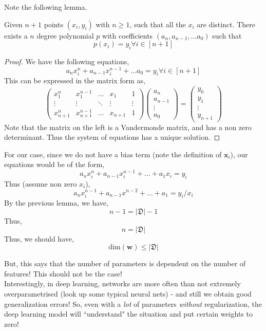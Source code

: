 Note the following lemma.
\begin{lemma}
Given $n+1$ points $(x_i,y_i)$ with $n \geq 1$, such that all the $x_i$ are distinct. There exists a $n$ degree polynomial $p$ with coefficients $(a_n,a_{n-1}, \dots a_0)$ such that
\[p(x_i) = y_i \forall i \in [n+1]\]
\end{lemma}
\begin{proof}
We have the following equations,
\[a_nx_i^n + a_{n-1}x_i^{n-1} + \dots a_0 = y_i \forall i \in [n+1]\]
This can be expressed in the matrix form as,
\[\begin{pmatrix} x_1^n & x_1^{n-1} & \dots &x_1& 1 \\ 
\vdots & \vdots & \ddots &\vdots&\vdots \\  x_{n+1}^n & x_{n+1}^{n-1} & \dots &x_{n+1}& 1
\end{pmatrix} \begin{pmatrix} a_n \\ a_{n-1} \\ \vdots \\ a_0 \end{pmatrix} = \begin{pmatrix}y_{0} \\ y_1 \\ \vdots \\ y_{n+1}\end{pmatrix}
\]
Note that the matrix on the left is a Vandermonde matrix, and has a non zero determinant. Thus the system of equations has a unique solution.
\end{proof}


For our case, since we do not have a bias term (note the definition of $\mathbf{x}_i$), our equations would be of the form,
\[a_nx_i^n + a_{n-1}x_i^{n-1} + \dots + a_1x_i = y_i\]
Thus (assume non zero $x_i$), 
\[a_nx_i^{n-1} + a_{n-1}x^{n-2} + \dots + a_1 = y_i/x_i\]
By the previous lemma, we have,
\[n - 1 = |\mathfrak{D}| - 1\]
Thus, \[n = |\mathfrak{D}|\]
Thus, we should have,
\[\text{dim}(\mathbf{w}) \leq |\mathfrak{D}|\]
\hfill\qedsymbol


But, this says that the number of parameters is dependent on the number of features! This should not be the case! \\ 
Interestingly, in deep learning, networks are more often than not extremely overparametrised (look up some typical neural nets) - and still we obtain good generalization errors! So, even with a \textit{lot} of parameters \textit{without} regularization, the deep learning model will ``understand" the situation and put certain weights to zero!

